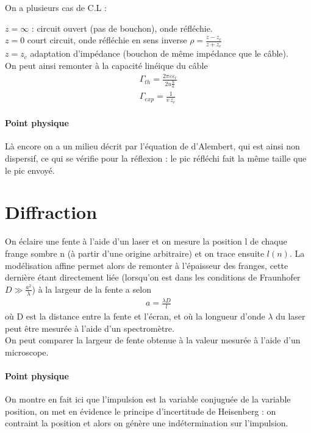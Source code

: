 \documentclass[12pt,prb,aps,epsf]{article}
\begin{document}
On a plusieurs cas de C.L : 

$z=\infty$ : circuit ouvert (pas de bouchon), onde réfléchie.\\

$z=0$ court circuit, onde réfléchie en sens inverse $\rho = \frac{z-z_c}{z+z_c}$\\

$z=z_c$ adaptation d'impédance (bouchon de même impédance que le câble).\\
On peut ainsi remonter à la capacité linéique du câble
\begin{eqnarray}
\Gamma_{th} = \frac{2\pi\varepsilon\varepsilon_r}{2u\frac{b}{a}}\\
\Gamma _{exp} = \frac{1}{v\,z_c}
\end{eqnarray}

\paragraph{Point physique} Là encore on a un milieu décrit par l'équation de d'Alembert, qui est ainsi non dispersif, ce qui se vérifie pour la réflexion : le pic réfléchi fait la même taille que le pic envoyé.

\section{Diffraction}	
On éclaire une fente à l'aide d'un laser et on mesure la position l de chaque frange sombre n (à partir d'une origine arbitraire) et on trace ensuite $l(n)$. La modélisation affine permet alors de remonter à l'épaisseur des franges, cette dernière étant directement liée (lorsqu'on est dans les conditions de Fraunhofer $D\gg\frac{a^2}{\lambda}$) à la largeur de la fente a selon
\begin{eqnarray}
a = \frac{\lambda D}{l}
\end{eqnarray}
où D est la distance entre la fente et l'écran, et où la longueur d'onde $\lambda$ du laser peut être mesurée à l'aide d'un spectromètre.\\
On peut comparer la largeur de fente obtenue à la valeur mesurée à l'aide d'un microscope.

\paragraph{Point physique} On montre en fait ici que l'impulsion est la variable conjuguée de la variable position, on met en évidence le principe d'incertitude de Heisenberg : on contraint la position et alors on génère une indétermination sur l'impulsion.
\end{document}
